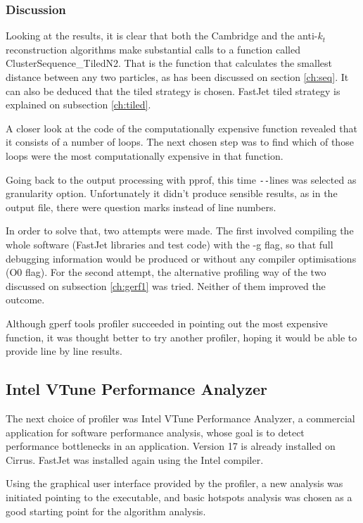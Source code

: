 \subsubsection{Discussion} 
Looking at the results, it is clear that both the Cambridge and the anti-$k_t$ reconstruction algorithms make substantial calls to a function called ClusterSequence\_TiledN2. That is the function that calculates the smallest distance between any two particles, as has been discussed on section \ref{ch:seq}. It can also be deduced that the tiled strategy is chosen. FastJet tiled strategy is explained on subsection \ref{ch:tiled}.

A closer look at the code of the computationally expensive function revealed that it consists of a number of loops. The next chosen step was to find which of those loops were the most computationally expensive in that function.

Going back to the output processing with pprof, this time  \verb|--|lines was selected as granularity option. Unfortunately it didn't produce sensible results, as in the output file, there were question marks instead of line numbers. 

In order to solve that, two attempts were made. The first involved compiling the whole software (FastJet libraries and test code) with the -g flag, so that full debugging information would be produced or without any compiler optimisations (O0 flag). For the second attempt, the alternative profiling way of the two discussed on subsection \ref{ch:gerf1} was tried. Neither of them improved the outcome.

Although gperf tools profiler succeeded in pointing out the most expensive function, it was thought better to try another profiler, hoping it would be able to provide line by line results.

\subsection{Intel VTune Performance Analyzer}\label{ch:vtune}
The next choice of profiler was Intel VTune Performance Analyzer\cite{malladi2009using}, a commercial application for software performance analysis, whose goal is to detect performance bottlenecks in an application. Version 17 is already installed on Cirrus. FastJet was installed again using the Intel compiler.

Using the graphical user interface provided by the profiler, a  new analysis was initiated pointing to the executable, and basic hotspots analysis was chosen as a good starting point for the algorithm analysis.

